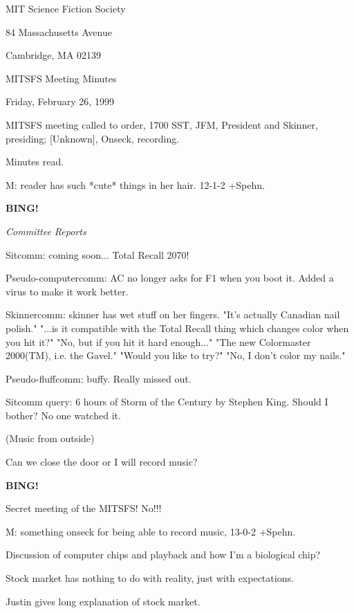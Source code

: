 \documentclass[12pt]{article}
\newcommand{\bing}{{\bf BING!} }
\newcommand{\goto}[1]{\bing \vskip 12pt \centerline{{\em{#1}}}}
\begin{document}
\begin{center}

MIT Science Fiction Society 

84 Massachusetts Avenue

Cambridge, MA 02139

\vspace{12pt}

MITSFS Meeting Minutes 

Friday, February 26, 1999

\end{center}
 
\vspace{18pt}

\setlength{\parskip}{6pt}

\noindent
MITSFS meeting called to order, 1700 SST,
JFM, President and Skinner, presiding; [Unknown], Onseck, recording.

Minutes read.

M: reader has such *cute* things in her hair. 12-1-2 +Spehn.

\goto{Committee Reports}

Sitcomm: coming soon... Total Recall 2070!

Pseudo-computercomm: AC no longer asks for F1 when you boot it. Added a virus to make it work better.

Skinnercomm: skinner has wet stuff on her fingers. "It's actually Canadian nail polish." "...is it compatible with the Total Recall thing which changes color when you hit it?" "No, but if you hit it hard enough..." "The new Colormaster 2000(TM), i.e. the Gavel." "Would you like to try?" "No, I don't color my nails."

Pseudo-fluffcomm: buffy. Really missed out.

Sitcomm query: 6 hours of Storm of the Century by Stephen King. Should I bother? No one watched it.

(Music from outside)

Can we close the door or I will record music?

\bing

Secret meeting of the MITSFS! No!!!

M: something onseck for being able to record music, 13-0-2 +Spehn.

Discussion of computer chips and playback and how I'm a biological chip?

Stock market has nothing to do with reality, just with expectations.

Justin gives long explanation of stock market.
\end{document}
